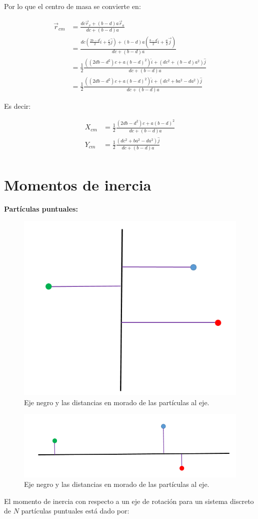 \documentclass[a4paper,11pt]{article}
\theoremstyle{mytheor}
\begin{document}
Por lo que el centro de masa se convierte en:

\begin{align*}
\vec{r}_{cm}  &= \frac{  dc \vec{r}_v+  (b-d)a \vec{r}_a}{ dc + (b-d)a}\\
&= \frac{  dc ( \frac{2b-d}{2}\hat{i} + \frac{c}{2}\hat{j})+  (b-d)a (\frac{b-d}{2} \hat{i} + \frac{a}{2} \vec{j})}{ dc + (b-d)a}\\
& =\frac{1}{2} \frac{  ((2db-d^2)c +a(b-d)^2) \hat{i} + (dc^2+(b-d)a^2)\hat{j}}{ dc + (b-d)a}\\
& = \frac{1}{2} \frac{   ((2db-d^2)c +a(b-d)^2) \hat{i} + (dc^2+ba^2-da^2)\hat{j}}{ dc + (b-d)a}
\end{align*}

Es decir:

\begin{align*}
X_{cm}  &= \frac{1}{2} \frac{   (2db-d^2)c +a(b-d)^2 }{ dc + (b-d)a}\\
Y_{cm}&= \frac{1}{2} \frac{   (dc^2+ba^2-da^2)\hat{j}}{ dc + (b-d)a}\\
\end{align*}

\section{Momentos de inercia}

\textbf{Partículas puntuales:}

\begin{figure}[h]
	\includegraphics[width=0.4\linewidth]{rot1}
	\caption{Eje negro y las distancias en morado de las partículas al eje.}
	\label{fcN4}
\end{figure}

\begin{figure}[h]
	\includegraphics[width=0.5\linewidth]{rot2}
	\caption{Eje negro y las distancias en morado de las partículas al eje.}
	\label{fcN4}
\end{figure}
El momento de inercia con respecto a un eje de rotación para un sistema discreto de $N$ partículas puntuales  está dado por:
\end{document}
